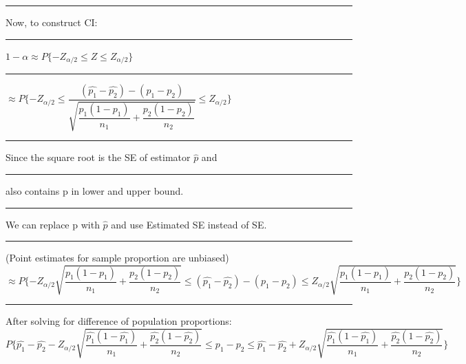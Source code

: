 \documentclass[]{article}
\begin{document}
\newline
\newline
\newline\Large\rule{3.0cm}{0pt} Now, to construct CI:
\newline
\newline\Large\rule{3.0cm}{0pt} $1 - \alpha \approx P \{ -Z_{\alpha / 2} \le Z \le Z_{\alpha / 2} \}$ 
\newline
\newline
\newline\Large\rule{4.3cm}{0pt} $\approx P \{ -Z_{ \alpha / 2} \le \dfrac{(\hat{p_1} - \hat{p_2}) - (p_1 - p_2) }{\sqrt{\dfrac{p_1 (1 - p_1)}{n_1} + \dfrac{p_2 (1 - p_2)}{n_2}}}  \le Z_{\alpha /2} \}$
\newline 
\newline
\newline 
\newline\Large\rule{3.0cm}{0pt} Since the square root is the SE of estimator $\hat{p}$ and 
\newline\Large\rule{3.0cm}{0pt} also contains p in lower and upper bound.
\newline\Large\rule{3.0cm}{0pt} We can replace p with $\hat{p}$ and use Estimated SE instead of SE.
\newline\Large\rule{3.0cm}{0pt} (Point estimates for sample proportion are unbiased)
\newline 
\newline $\approx P \{ -Z_{ \alpha / 2} \sqrt{\dfrac{p_1 (1 - p_1)}{n_1} + \dfrac{p_2 (1 - p_2)}{n_2}}  \le (\hat{p_1} - \hat{p_2}) - (p_1 - p_2)  \le Z_{\alpha /2} \sqrt{\dfrac{p_1 (1 - p_1)}{n_1} + \dfrac{p_2 (1 - p_2)}{n_2}} \}$
\newline
\newline 
\newline\Large\rule{3.0cm}{0pt} After solving for difference of population proportions:
\newline
\newline $P \{ \hat{p_1} - \hat{p_2}-Z_{ \alpha / 2} \sqrt{\dfrac{ \hat{p_1} (1 - \hat{p_1})}{n_1} + \dfrac{\hat{p_2} (1 - \hat{p_2})}{n_2}}  \le p_1 - p_2  \le \hat{p_1} - \hat{p_2} + Z_{\alpha /2} \sqrt{\dfrac{\hat{p_1} (1 - \hat{p_1})}{n_1} + \dfrac{\hat{p_2} (1 - \hat{p_2})}{n_2}} \}$
\newline 
 
\section{}
\end{document}
